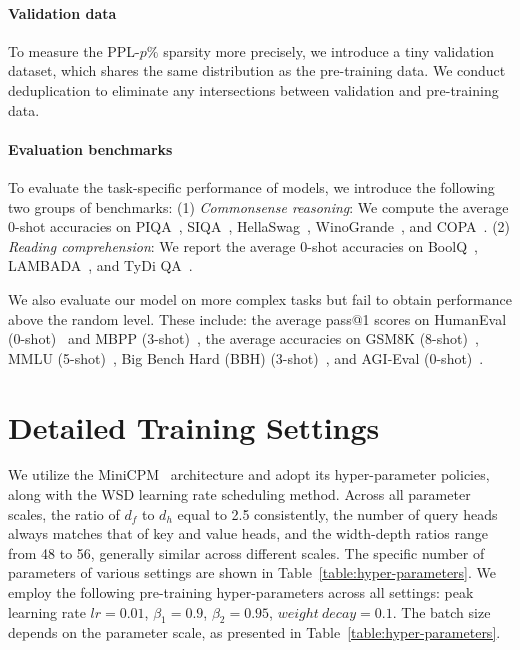 \documentclass{article} %
\begin{document}
\paragraph{Validation data} To measure the PPL-$p\%$ sparsity more precisely, we introduce a tiny validation dataset, which shares the same distribution as the pre-training data. We conduct deduplication to eliminate any intersections between validation and pre-training data.

\paragraph{Evaluation benchmarks} To evaluate the task-specific performance of models, we introduce the following two groups of benchmarks:
(1) \textit{Commonsense reasoning}: We compute the average 0-shot accuracies on PIQA~\citep{piqa}, SIQA~\citep{siqa}, HellaSwag~\citep{hellaswag}, WinoGrande~\citep{winogrande}, and COPA~\citep{copa}.
(2) \textit{Reading comprehension}: We report the average 0-shot accuracies on BoolQ~\citep{boolq}, LAMBADA~\citep{lambada}, and TyDi QA~\citep{tydiqa}.

We also evaluate our model on more complex tasks but fail to obtain performance above the random level. These include: the average pass@1 scores on HumanEval (0-shot)~\citep{humaneval} and MBPP (3-shot)~\citep{mbpp}, the average accuracies on GSM8K (8-shot)~\citep{gsm8k}, MMLU (5-shot)~\citep{mmlu}, Big Bench Hard (BBH) (3-shot)~\citep{bbh}, and AGI-Eval (0-shot)~\citep{agieval}.

\section{Detailed Training Settings} \label{sec:detail-training-setting}

We utilize the MiniCPM~\citep{hu2024minicpm} architecture and adopt its hyper-parameter policies, along with the WSD learning rate scheduling method.
Across all parameter scales, the ratio of $d_f$ to $d_h$ equal to 2.5 consistently, the number of query heads always matches that of key and value heads, and the width-depth ratios range from 48 to 56, generally similar across different scales. The specific number of parameters of various settings are shown in Table~\ref{table:hyper-parameters}.
We employ the following pre-training hyper-parameters across all settings: peak learning rate $lr=0.01$, $\beta_1=0.9$, $\beta_2=0.95$, $weight\ decay = 0.1$. The batch size depends on the parameter scale, as presented in Table~\ref{table:hyper-parameters}.
\end{document}
